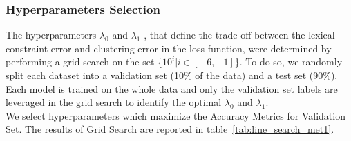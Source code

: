 \subsubsection{\label{seq:hyperparam}Hyperparameters Selection}
The hyperparameters $\lambda_0$ and $\lambda_1$ , that define the trade-off 
between the lexical constraint error and clustering  error in the loss function, 
were determined by performing a grid search on the set \{$10^i | i \in [-6, -1]$\}.
To do so, we randomly split each dataset into a validation set (10\% of the 
data) and a test set (90\%). Each model is trained on the whole data and only 
the validation set labels are leveraged in the grid search to identify the 
optimal $\lambda_0$ and $\lambda_1$.
\\We select hyperparameters which maximize the Accuracy Metrics for Validation Set.
The results of Grid Search are reported in table~\ref{tab:line_search_met1}.
